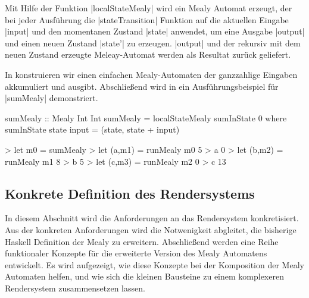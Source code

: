 Mit Hilfe der Funktion |localStateMealy| wird ein Mealy Automat erzeugt, der bei jeder Ausführung die |stateTransition| Funktion auf die aktuellen Eingabe |input| und den momentanen Zustand |state| anwendet, um eine Ausgabe |output| und einen neuen Zustand |state'| zu erzeugen. |output| und der rekursiv mit dem neuen Zustand erzeugte Meleay-Automat werden als Resultat zurück geliefert.

In  konstruieren wir einen einfachen Mealy-Automaten der ganzzahlige Eingaben akkumuliert und ausgibt. Abschließend wird in  ein Ausführungsbeispiel für |sumMealy| demonstriert.

\begin{haskell}[label={lst:state-mealy-beispiel},caption={[Beispiel Mealy Automat mit lokalem Zustand]Beispiel Mealy Automat mit lokalem Zustand}]
sumMealy :: Mealy Int Int
sumMealy = localStateMealy sumInState 0 where
	sumInState state input = (state, state + input)
\end{haskell}

\begin{haskell}[label={lst:state-mealy-ausfuehrung},nolol,caption={Ausführung Mealy Automat mit lokalem Zustand}]
> let m0 = sumMealy
> let (a,m1) = runMealy m0 5
> a
0
> let (b,m2) = runMealy m1 8
> b
5
> let (c,m3) = runMealy m2 0
> c
13
\end{haskell}

\subsection{Konkrete Definition des Rendersystems}
\label{sec:konkret-rendersystem}

In diesem Abschnitt wird die Anforderungen an das Rendersystem konkretisiert. Aus der konkreten Anforderungen wird die Notwenigkeit abgleitet, die bisherige Haskell Definition der Mealy zu erweitern. Abschließend werden eine Reihe funktionaler Konzepte für die erweiterte Version des Mealy Automatens entwickelt. Es wird aufgezeigt, wie diese Konzepte bei der Komposition der Mealy Automaten helfen, und wie sich die kleinen Bausteine zu einem komplexeren Rendersystem zusammensetzen lassen.

